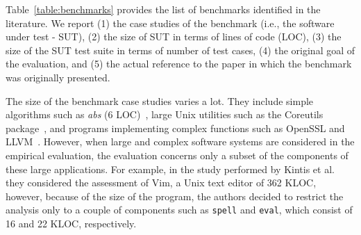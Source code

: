 Table~\ref{table:benchmarks} provides the list of benchmarks identified in the literature. We report (1) the case studies of the benchmark (i.e., the software under test - SUT), (2) the size of SUT in terms of lines of code (LOC), (3) the size of the SUT test suite in terms of number of test cases, (4) the original goal of the evaluation, and (5) the actual reference to the paper in which the benchmark was originally presented. 




The size of the benchmark case studies varies a lot. They include simple algorithms such as \textit{abs} (6 LOC)~\cite{tokumoto2016muvm}, large Unix utilities such as the Coreutils package~\cite{hariri2019comparing,papadakis2018mutation,chekam2017empirical}, and programs implementing complex functions such as OpenSSL and LLVM~\cite{denisov2018mull}.
However, when large and complex software systems are considered in the empirical evaluation, the evaluation concerns only a subset of the components of these large applications.
For example, in the study performed by Kintis et al.~\cite{kintis2017detecting} they considered the assessment of Vim, a Unix text editor of 362 KLOC, however, because of the size of the program, the authors decided to restrict the analysis only to a couple of components such as \texttt{spell} and \texttt{eval}, which consist of 16 and 22 KLOC, respectively. 



